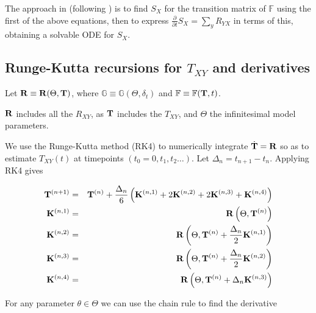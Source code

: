 \documentclass{article}
\begin{document}
The approach in \cite{Holmes2020} (following \cite{DeMaio2020}) is to find $S_X$ for the transition matrix of $\mathbb{F}$ using
the first of the above equations, then to express $\frac{\partial}{\partial t} S_X = \sum_y R_{YX}$
in terms of this, obtaining a solvable ODE for $S_X$.


\subsection{Runge-Kutta recursions for $T_{XY}$ and derivatives}

Let ${\bf R} \equiv {\bf R}(\Theta,{\bf T})$,
where $\mathbb{G} \equiv \mathbb{G}(\Theta,\delta_t)$
and $\mathbb{F} \equiv \mathbb{F}({\bf T},t)$.

${\bf R}$ includes all the $R_{XY}$, as ${\bf T}$ includes the $T_{XY}$, and $\Theta$ the infinitesimal model parameters.

We use the Runge-Kutta method (RK4) to numerically integrate $\dot{\bf T}={\bf R}$
so as to estimate $T_{XY}(t)$ at timepoints $(t_0=0, t_1, t_2 \ldots)$.
Let $\Delta_n = t_{n+1}-t_n$.
Applying RK4 gives

\begin{eqnarray*}
  {\bf T}^{(n+1)} & = & {\bf T}^{(n)} + \frac{\Delta_n}{6} \left( {\bf K}^{(n,1)} + 2{\bf K}^{(n,2)} + 2{\bf K}^{(n,3)} + {\bf K}^{(n,4)} \right) \\
  {\bf K}^{(n,1)} & = & {\bf R}\left(\Theta,{\bf T}^{(n)}\right) \\
  {\bf K}^{(n,2)} & = & {\bf R}\left(\Theta,{\bf T}^{(n)} + \frac{\Delta_n}{2} {\bf K}^{(n,1)}\right) \\
  {\bf K}^{(n,3)} & = & {\bf R}\left(\Theta,{\bf T}^{(n)} + \frac{\Delta_n}{2} {\bf K}^{(n,2)}\right) \\
  {\bf K}^{(n,4)} & = & {\bf R}\left(\Theta,{\bf T}^{(n)} + \Delta_n {\bf K}^{(n,3)}\right)
\end{eqnarray*}

For any parameter $\theta \in \Theta$ we can use the chain rule to find the derivative
\end{document}
